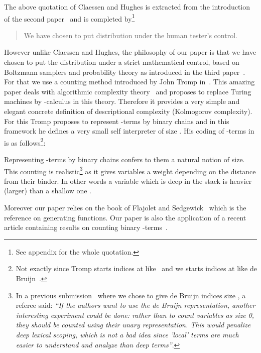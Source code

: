 \documentclass{sig-alternate}
\begin{document}
The above quotation of Claessen and Hughes is extracted from the introduction
of the second paper~\cite{DBLP:conf/icfp/ClaessenH00} and is completed
by\footnote{See appendix for the whole quotation.}
\begin{it}
  \begin{quotation} We have chosen to put distribution under the human tester's
    control.
  \end{quotation}
\end{it}
However unlike Claessen and Hughes, the philosophy of our paper is that we have
chosen to put the distribution under a strict mathematical control, based on
Boltzmann samplers and probability theory as introduced in the third
paper~\cite{DBLP:journals/cpc/DuchonFLS04}.  For that we use a counting method
introduced by John Tromp in~\cite{DBLP:conf/dagstuhl/Tromp06}.  This amazing paper
deals with algorithmic complexity theory~\cite{261084} and proposes to replace Turing
machines by -calculus in this theory. Therefore it provides a very simple and
elegant concrete definition of descriptional complexity (Kolmogorov complexity). For
this Tromp proposes to represent -terms by binary chains and in this framework he
defines a very small self interpreter of size .  His coding of -terms in
 is as follows\footnote{Not exactly since Tromp starts indices at 
  like~\cite{LescannePOPL94} and we starts indices at  like de
  Bruijn~\cite{NGDeBruijn108}.}:

Representing -terms by binary chains confers to them a natural notion of size.
This counting is realistic\footnote{In a previous
  submission~\cite{DBLP:journals/jfp/GrygielL13} where we chose to give de Bruijn indices
  size , a referee said: \emph{``If the authors want to use the de Bruijn
  representation, another interesting experiment could be done: rather than to count
  variables as size 0, they should be counted using their \emph{unary}
  representation.  This would penalize deep lexical scoping, which is not a bad idea
  since 'local' terms are much easier to understand and analyze than deep terms''}. }
as it gives variables a weight depending on the distance from their binder. In other
words a variable which is deep in the stack is heavier (larger) than a shallow one .

Moreover our paper relies on the book of Flajolet and
Sedgewick~\cite{flajolet08:_analy_combin} which is the reference on generating
functions.  Our paper is also the application of a recent article containing results
on counting binary -terms~\cite{DBLP:journals/corr/GrygielL14}.
\end{document}
